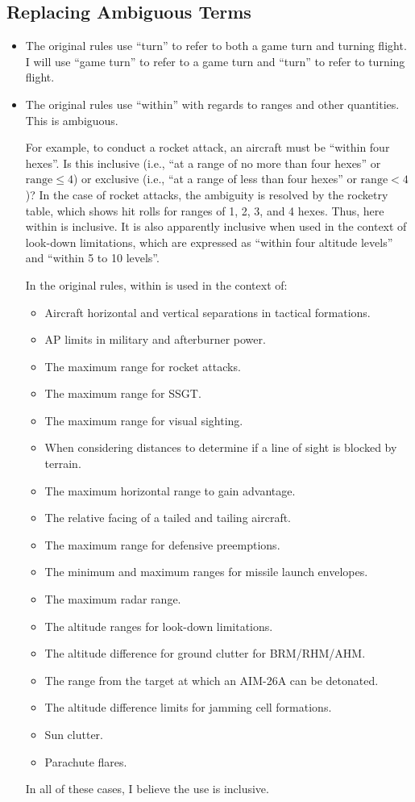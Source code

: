 \documentclass[10pt]{article}
\begin{document}
\subsection{Replacing Ambiguous Terms}

\begin{itemize}
    \item {} The original rules use “turn” to refer to both a game turn and turning flight. I will use “game turn” to refer to a game turn and “turn” to refer to turning flight.

    \item {} The original rules use “within” with regards to ranges and other quantities. This is ambiguous. 
    
    For example, to conduct a rocket attack, an aircraft must be “within four hexes”. Is this inclusive (i.e., “at a range of no more than four hexes” or $\textrm{range}\le4$) or exclusive (i.e., “at a range of less than four hexes” or $\textrm{range}<4$)? In the case of rocket attacks, the ambiguity is resolved by the rocketry table, which shows hit rolls for ranges of 1, 2, 3, and 4 hexes. Thus, here within is inclusive. It is also apparently inclusive when used in the context of look-down limitations, which are expressed as “within four altitude levels” and “within 5 to 10 levels”.

    In the original rules, within is used in the context of:
    \begin{itemize}
    \item Aircraft horizontal and vertical separations in tactical formations.
    \item AP limits in military and afterburner power.
    \item The maximum range for rocket attacks.
    \item The maximum range for SSGT.
    \item The maximum range for visual sighting.
    \item When considering distances to determine if a line of sight is blocked by terrain.
    \item The maximum horizontal range to gain advantage.
    \item The relative facing of a tailed and tailing aircraft.
    \item The maximum range for defensive preemptions.
    \item The minimum and maximum ranges for missile launch envelopes.
    \item The maximum radar range.
    \item The altitude ranges for look-down limitations.
    \item The altitude difference for ground clutter for BRM/RHM/AHM.
    \item The range from the target at which an AIM-26A can be detonated.
    \item The altitude difference limits for jamming cell formations.
    \item Sun clutter.
    \item Parachute flares.
    \end{itemize}
    In all of these cases, I believe the use is inclusive.


\end{itemize}
\end{document}
